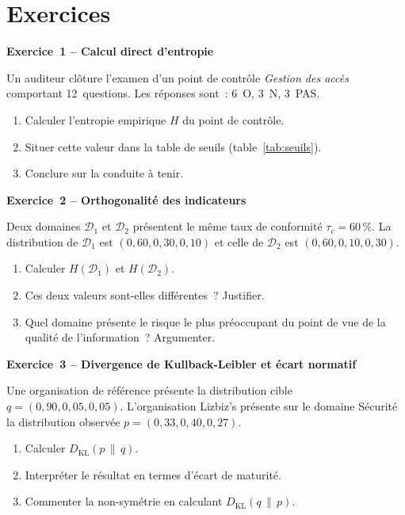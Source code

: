 \section*{Exercices}


\begin{boxexo}
\textbf{Exercice~1 – Calcul direct d'entropie}

Un auditeur clôture l'examen d'un point de contrôle \emph{Gestion des accès}
comportant 12~questions. Les réponses sont~: 6~O, 3~N, 3~PAS.

\begin{enumerate}[label=(\alph*)]
  \item Calculer l'entropie empirique $H$ du point de contrôle.
  \item Situer cette valeur dans la table de seuils (table~\ref{tab:seuils}).
  \item Conclure sur la conduite à tenir.
\end{enumerate}
\end{boxexo}

\begin{boxexo}
\textbf{Exercice~2 – Orthogonalité des indicateurs}

Deux domaines $\mathcal{D}_1$ et $\mathcal{D}_2$ présentent le même taux de
conformité $\tau_c = 60\,\%$. La distribution de $\mathcal{D}_1$ est
$(0{,}60, 0{,}30, 0{,}10)$ et celle de $\mathcal{D}_2$ est $(0{,}60, 0{,}10, 0{,}30)$.

\begin{enumerate}[label=(\alph*)]
  \item Calculer $H(\mathcal{D}_1)$ et $H(\mathcal{D}_2)$.
  \item Ces deux valeurs sont-elles différentes~? Justifier.
  \item Quel domaine présente le risque le plus préoccupant du point de vue de
        la qualité de l'information~? Argumenter.
\end{enumerate}
\end{boxexo}

\begin{boxexo}
\textbf{Exercice~3 – Divergence de Kullback-Leibler et écart normatif}

Une organisation de référence présente la distribution cible
$q = (0{,}90, 0{,}05, 0{,}05)$. L'organisation Lizbiz's présente sur le domaine
Sécurité la distribution observée $p = (0{,}33, 0{,}40, 0{,}27)$.

\begin{enumerate}[label=(\alph*)]
  \item Calculer $D_{\mathrm{KL}}(p \,\|\, q)$.
  \item Interpréter le résultat en termes d'écart de maturité.
  \item Commenter la non-symétrie en calculant $D_{\mathrm{KL}}(q \,\|\, p)$.
\end{enumerate}
\end{boxexo}


